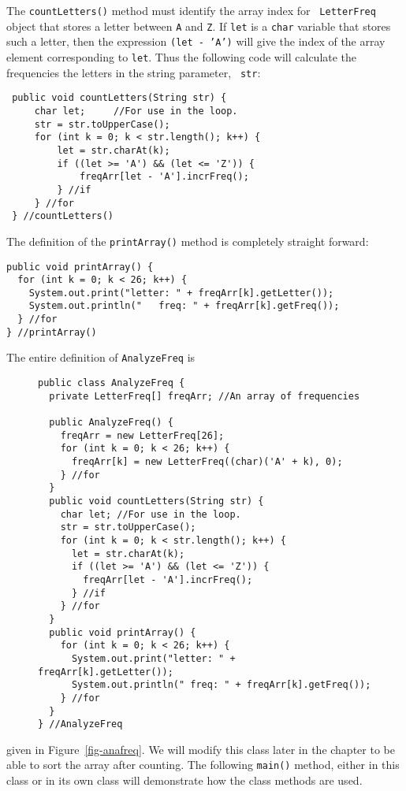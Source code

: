 \noindent The {\tt countLetters()} method must identify the array index for {\tt
LetterFreq} object that stores a letter between {\tt A} and {\tt Z}.
If {\tt let} is a {\tt char} variable that stores such a letter, then
the expression {\tt (let - 'A')} will give the index of the array
element corresponding to {\tt let}.  Thus the following code will
calculate the frequencies the letters in the string parameter, {\tt
str}:

\begin{jjjlisting}
\begin{lstlisting}
 public void countLetters(String str) {
     char let;     //For use in the loop.
     str = str.toUpperCase();
     for (int k = 0; k < str.length(); k++) {
         let = str.charAt(k);
         if ((let >= 'A') && (let <= 'Z')) {
             freqArr[let - 'A'].incrFreq();
         } //if
     } //for
 } //countLetters()
\end{lstlisting}
\end{jjjlisting}

\noindent The definition of the {\tt printArray()} method is completely
straight forward:

\begin{jjjlisting}
\begin{lstlisting}
public void printArray() {
  for (int k = 0; k < 26; k++) {
    System.out.print("letter: " + freqArr[k].getLetter());
    System.out.println("   freq: " + freqArr[k].getFreq());
  } //for
} //printArray()
\end{lstlisting}
\end{jjjlisting}

\noindent The entire definition of {\tt AnalyzeFreq} is
\begin{figure}[tb]
\jjjprogstart
\begin{jjjlisting}[26.5pc]
\begin{lstlisting}
public class AnalyzeFreq {
  private LetterFreq[] freqArr; //An array of frequencies

  public AnalyzeFreq() {
    freqArr = new LetterFreq[26];
    for (int k = 0; k < 26; k++) {
      freqArr[k] = new LetterFreq((char)('A' + k), 0);
    } //for
  }
  public void countLetters(String str) {
    char let; //For use in the loop.
    str = str.toUpperCase();
    for (int k = 0; k < str.length(); k++) {
      let = str.charAt(k);
      if ((let >= 'A') && (let <= 'Z')) {
        freqArr[let - 'A'].incrFreq();
      } //if
    } //for
  }
  public void printArray() {
    for (int k = 0; k < 26; k++) {
      System.out.print("letter: " + freqArr[k].getLetter());
      System.out.println(" freq: " + freqArr[k].getFreq());
    } //for
  } 
} //AnalyzeFreq
\end{lstlisting}
\end{jjjlisting}
\end{figure}
\noindent given in Figure~\ref{fig-anafreq}. We will modify this class later in
the chapter to be able to sort the array after counting.  The
following {\tt main()} method, either in this class or in its own
class will demonstrate how the class methods are used.

